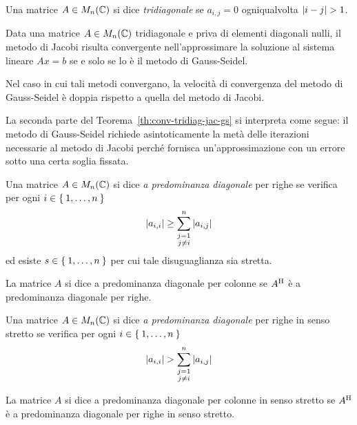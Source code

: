 	\begin{definizione}
		Una matrice \(A \in M_n (\mathbb{C})\) si dice \emph{tridiagonale} se \(a_{i, j} = 0\) ogniqualvolta \(\abs{i - j} > 1\).
	\end{definizione}

	\begin{teorema}\label{th:conv-tridiag-jac-gs}
		Data una matrice \(A \in M_n (\mathbb{C})\) tridiagonale e priva di elementi diagonali nulli, il metodo di Jacobi risulta convergente nell'approssimare la soluzione al sistema lineare \(A x = b\) se e solo se lo è il metodo di Gauss-Seidel.
		
		Nel caso in cui tali metodi convergano, la velocità di convergenza del metodo di Gauss-Seidel è doppia rispetto a quella del metodo di Jacobi.
	\end{teorema}

	La seconda parte del Teorema~\ref{th:conv-tridiag-jac-gs} si interpreta come segue: il metodo di Gauss-Seidel richiede asintoticamente la metà delle iterazioni necessarie al metodo di Jacobi perché fornisca un'approssimazione con un errore sotto una certa soglia fissata.
	
	\begin{definizione}
		Una matrice \(A \in M_n (\mathbb{C})\) si dice \emph{a predominanza diagonale} per righe se verifica per ogni \(i \in \Set{1, \dots, n}\)
		\begin{equation*}
			\abs{a_{i, i}} \ge \sum_{\substack{j = 1 \\ j \ne i}}^n \abs{a_{i, j}}
		\end{equation*}
		ed esiste \(s \in \Set{1, \dots, n}\) per cui tale disuguaglianza sia stretta.
		
		La matrice \(A\) si dice a predominanza diagonale per colonne se \(A^\mathrm{H}\relax\) è a predominanza diagonale per righe.
	\end{definizione}

	\begin{definizione}
		Una matrice \(A \in M_n (\mathbb{C})\) si dice \emph{a predominanza diagonale} per righe in senso stretto se verifica per ogni \(i \in \Set{1, \dots, n}\)
		\begin{equation*}
			\abs{a_{i, i}} > \sum_{\substack{j = 1 \\ j \ne i}}^n \abs{a_{i, j}}
		\end{equation*}
	
		La matrice \(A\) si dice a predominanza diagonale per colonne in senso stretto se \(A^\mathrm{H}\relax\) è a predominanza diagonale per righe in senso stretto.
	\end{definizione}

